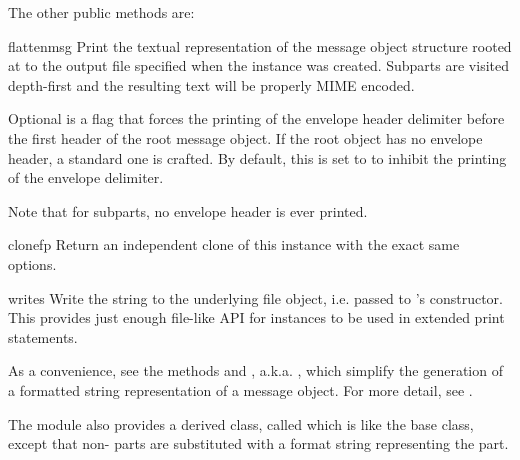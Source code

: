 The other public  methods are:

\begin{methoddesc}[Generator]{flatten}{msg}
Print the textual representation of the message object structure rooted at
 to the output file specified when the 
instance was created.  Subparts are visited depth-first and the
resulting text will be properly MIME encoded.

Optional  is a flag that forces the printing of the
envelope header delimiter before the first  header of the
root message object.  If the root object has no envelope header, a
standard one is crafted.  By default, this is set to  to
inhibit the printing of the envelope delimiter.

Note that for subparts, no envelope header is ever printed.

\end{methoddesc}

\begin{methoddesc}[Generator]{clone}{fp}
Return an independent clone of this  instance with
the exact same options.

\end{methoddesc}

\begin{methoddesc}[Generator]{write}{s}
Write the string  to the underlying file object,
i.e.  passed to 's constructor.  This
provides just enough file-like API for  instances to
be used in extended print statements.
\end{methoddesc}

As a convenience, see the methods  and
, a.k.a. , which
simplify the generation of a formatted string representation of a
message object.  For more detail, see .

The  module also provides a derived class,
called  which is like the 
base class, except that non- parts are substituted with
a format string representing the part.

